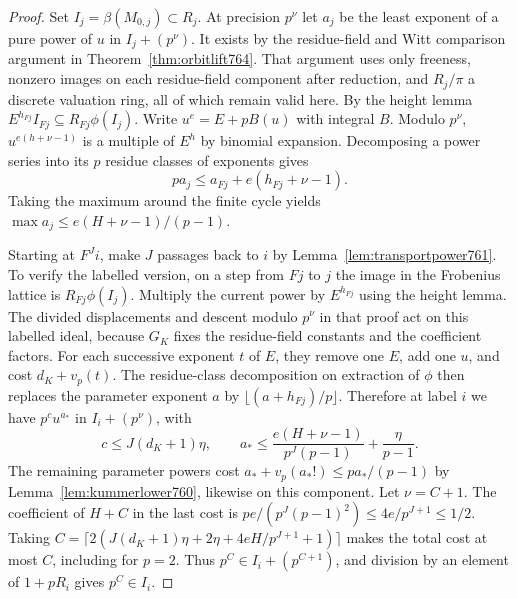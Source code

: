 \documentclass[a4paper,11pt]{article}
\theoremstyle{definition}
\theoremstyle{remark}
\numberwithin{equation}{section}
\begin{document}
\begin{proof}
Set \(I_j=\beta(M_{0,j})\subset R_j\). At precision
\(p^\nu\) let \(a_j\) be the least exponent of a pure
power of \(u\) in \(I_j+(p^\nu)\). It exists by the
residue-field and Witt comparison argument in
Theorem~\ref{thm:orbitlift764}. That argument uses only
freeness, nonzero images on each residue-field component
after reduction, and \(R_j/\pi\) a discrete valuation
ring, all of which remain valid here. By the height
lemma \(E^{h_{Fj}}I_{Fj}\subseteq R_{Fj}\phi(I_j)\).
Write \(u^e=E+pB(u)\) with integral \(B\). Modulo
\(p^\nu\), \(u^{e(h+\nu-1)}\) is a multiple of \(E^h\)
by binomial expansion. Decomposing a power series into
its \(p\) residue classes of exponents gives
\[
           p a_j\le a_{Fj}+e(h_{Fj}+\nu-1).
\]
Taking the maximum around the finite cycle yields
\(\max a_j\le e(H+\nu-1)/(p-1)\).

Starting at \(F^J i\), make \(J\) passages back to
\(i\) by Lemma~\ref{lem:transportpower761}. To verify
the labelled version, on a step from \(Fj\) to \(j\)
the image in the Frobenius lattice is \(R_{Fj}\phi(I_j)\).
Multiply the current power by \(E^{h_{Fj}}\) using the
height lemma. The divided displacements and descent
modulo \(p^\nu\) in that proof act on this labelled
ideal, because \(G_K\) fixes the residue-field constants
and the coefficient factors. For each successive exponent
\(t\) of \(E\), they remove one \(E\), add one \(u\),
and cost \(d_K+v_p(t)\). The residue-class decomposition
on extraction of \(\phi\) then replaces the parameter
exponent \(a\) by \(\lfloor(a+h_{Fj})/p\rfloor\).
Therefore at label \(i\) we have \(p^{c}u^{a_*}\)
in \(I_i+(p^\nu)\), with
\[
 c\le J(d_K+1)\eta,\qquad
 a_*\le\frac{e(H+\nu-1)}{p^J(p-1)}+\frac{\eta}{p-1}.
\]
The remaining parameter powers cost
\(a_*+v_p(a_*!)\le p a_* /(p-1)\) by
Lemma~\ref{lem:kummerlower760}, likewise on this component.
Let \(\nu=C+1\). The coefficient of \(H+C\) in the last
cost is \(pe/(p^J(p-1)^2)\le 4e/p^{J+1}\le1/2\).
Taking \(C=\lceil2(J(d_K+1)\eta+2\eta+4eH/p^{J+1}+1)\rceil\)
makes the total cost at most \(C\), including for \(p=2\).
Thus \(p^C\in I_i+(p^{C+1})\), and division by an element
of \(1+pR_i\) gives \(p^C\in I_i\).
\end{proof}
\end{document}
